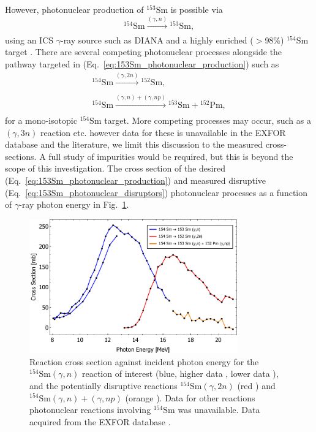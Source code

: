 \documentclass[../main.tex]{subfiles}
\begin{document}
However, photonuclear production of $^{153}\mathrm{Sm}$ \cite{carlos1974giant,filipescu2014photoneutron} is possible via
\begin{equation}
^{154}\mathrm{Sm}\xrightarrow[]{\left(\gamma,n\right)}{}^{153}\mathrm{Sm},
\label{eq:153Sm_photonuclear_production}    
\end{equation}
using an ICS $\gamma$-ray source such as DIANA and a highly enriched ($>$98\%) $^{154}\mathrm{Sm}$ target \cite{bell1987stable,isoflex2021sm}. There are several competing photonuclear processes alongside the pathway targeted in (Eq.~\ref{eq:153Sm_photonuclear_production}) such as \cite{carlos1974giant}
\begin{align}
^{154}\mathrm{Sm}\xrightarrow[]{\left(\gamma,2n\right)}{}^{152}\mathrm{Sm},\\
^{154}\mathrm{Sm}\xrightarrow[]{\left(\gamma,n\right)+\left(\gamma,np\right)}{}^{153}\mathrm{Sm}+{}^{152}\mathrm{Pm},
\label{eq:153Sm_photonuclear_disruptors}    
\end{align}
for a mono-isotopic $^{154}\mathrm{Sm}$ target. More competing processes may occur, such as a $\left(\gamma,3n\right)$ reaction etc. however data for these is unavailable in the EXFOR database \cite{zerkin2018experimental} and the literature, we limit this discussion to the measured cross-sections. A full study of impurities would be required, but this is beyond the scope of this investigation.   The cross section of the desired (Eq.~\ref{eq:153Sm_photonuclear_production}) and measured disruptive (Eq.~\ref{eq:153Sm_photonuclear_disruptors}) photonuclear processes as a function of $\gamma$-ray photon energy in Fig.~\ref{fig:154Sm_cross_section_photon_energy}.

\begin{figure}[!h]
\centering
\includegraphics[width=0.8\textwidth]{Figures/DIANA_Inverse_Compton_Source_Design/Sm154Landscape.pdf}
\caption{Reaction cross section against incident photon energy for the $^{154}\mathrm{Sm} \left(\gamma,n\right)$ reaction of interest (blue, higher data \cite{carlos1974giant}, lower data \cite{filipescu2014photoneutron}), and the potentially disruptive reactions $^{154}\mathrm{Sm} \left(\gamma,2n\right)$ (red \cite{carlos1974giant}) and $^{154}\mathrm{Sm} \left(\gamma,n\right) + \left(\gamma,np\right)$ (orange \cite{carlos1974giant}). Data for other reactions photonuclear reactions involving $^{154}\mathrm{Sm}$ was unavailable. Data acquired from the EXFOR database \cite{zerkin2018experimental}. }
\label{fig:154Sm_cross_section_photon_energy}
\end{figure}
\end{document}
